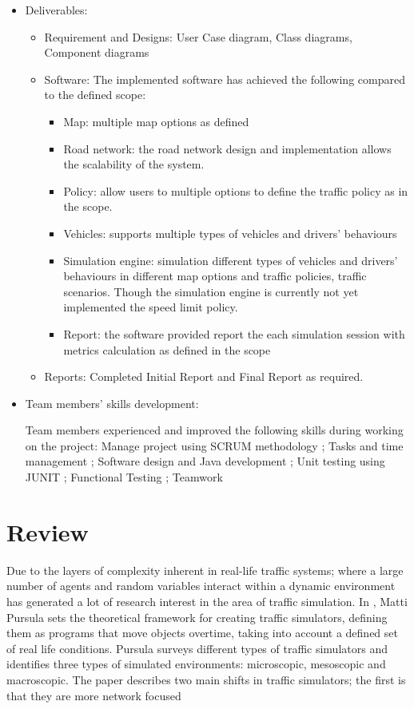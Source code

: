 \documentclass[11pt]{article}
\begin{document}
\begin{itemize}
\item Deliverables:
\begin{itemize}
    \item Requirement and Designs: User Case diagram, Class diagrams, Component diagrams 
    
    \item Software: The implemented software has achieved the following compared to the defined scope:
    \begin{itemize}
    \item Map: multiple map options as defined
    \item Road network: the road network design and implementation allows the scalability of the system.  
    \item Policy: allow users to multiple options to define the traffic policy as in the scope. 
    \item Vehicles: supports multiple types of vehicles and drivers' behaviours 
    \item Simulation engine: simulation different types of vehicles and drivers' behaviours in different map options and traffic policies, traffic scenarios. Though the simulation engine is  currently not yet implemented the speed limit policy.
    \item Report: the software provided report the each simulation session with metrics calculation as defined in the scope

    
    \end{itemize}
    \item Reports: Completed Initial Report and Final Report as required. 
\end{itemize}
\item Team members' skills development: 

\indent Team members experienced and improved the following skills during working on the project:
    Manage project using SCRUM methodology
    ; Tasks and time management
    ; Software design and Java development
    ; Unit testing using JUNIT
    ; Functional Testing
    ; Teamwork


\end{itemize}


\pagebreak
\section{Review}

Due to the layers of complexity inherent in real-life traffic systems; where a large number of agents and random variables interact within a dynamic environment has generated a lot of research interest in the area of traffic simulation. In \cite{Pursula}, Matti Pursula sets the theoretical framework for creating traffic simulators, defining them as programs that move objects overtime, taking into account a defined set of real life conditions. Pursula surveys different types of traffic simulators and identifies three types of simulated environments: microscopic, mesoscopic and macroscopic. The paper describes two main shifts in traffic simulators; the first is that they are more network focused 
\end{document}
